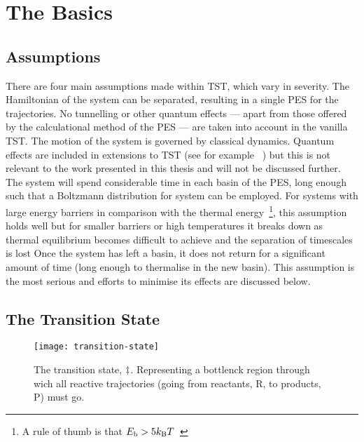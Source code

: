 \section{The Basics}
\subsection{Assumptions}
There are four main assumptions made within TST, which vary in severity.
The Hamiltonian of the system can be separated, resulting in a single PES for the trajectories.
No tunnelling or other quantum effects --- apart from those offered by the calculational method of the PES --- are taken into account in the vanilla TST.
The motion of the system is governed by classical dynamics.
Quantum effects are included in extensions to TST (see for example \cite{qtst-hj-1997, qtst-hj-1998, qtst-hj-2009}~\citemiss) but this is not relevant to the work presented in this thesis and will not be discussed further.
The system will spend considerable time in each basin of the PES, long enough such that a Boltzmann distribution for system can be employed.
For systems with large energy barriers in comparison with the thermal energy~\footnote{A rule of thumb is that $E_\text{b} > 5k_\text{B} T$~\cite{htst-5ev-2005}}, this assumption holds well but for smaller barriers or high temperatures it breaks down as thermal equilibrium becomes difficult to achieve and the separation of timescales is lost
Once the system has left a basin, it does not return for a significant amount of time (long enough to thermalise in the new basin).
This assumption is the most serious and efforts to minimise its effects are discussed below.

\subsection{The Transition State}

\begin{figure}[h]
\begin{center}
\texttt{[image: transition-state]}
    \parbox{0.85\linewidth}{
\caption{The transition state, $\ddagger$.
Representing a bottlenck region through wich all reactive trajectories (going from reactants, R, to products, P) must go.
}
\label{fig:transition-state}
    }
\end{center}
\end{figure}

